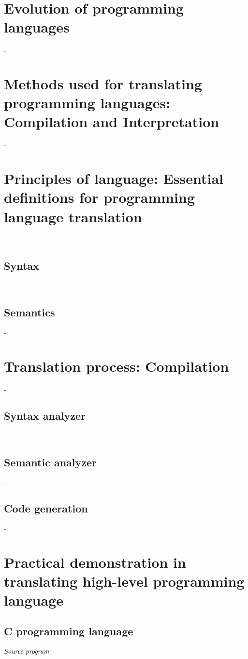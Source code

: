 \documentclass[journal]{IEEEtran}
\begin{document}
\section{Evolution of programming languages}
-


\section{Methods used for translating programming languages: Compilation and Interpretation}
-

\section{Principles of language: Essential definitions for programming language translation}
-
\subsection{Syntax}
-
\subsection{Semantics}
-
\section{Translation process: Compilation}
-
\subsection{Syntax analyzer}
-
\subsection{Semantic analyzer}
-
\subsection{Code generation}
-

\section{Practical demonstration in translating high-level programming language}
\subsection{C programming language}
$\\\textit{Source program}$
\end{document}
